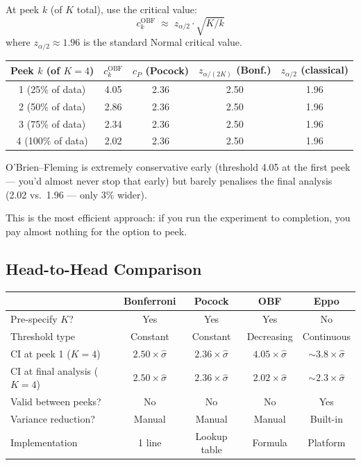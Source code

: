 \documentclass[12pt, a4paper]{article}
\begin{document}
At peek $k$ (of $K$ total), use the critical value:
\[
  c_k^{\text{OBF}} \;\approx\; z_{\alpha/2} \cdot \sqrt{K/k}
\]
where $z_{\alpha/2} \approx 1.96$ is the standard Normal critical value.

\begin{center}
\renewcommand{\arraystretch}{1.3}
\begin{tabular}{@{} c c c c c @{}}
\toprule
Peek $k$ (of $K{=}4$) & $c_k^{\text{OBF}}$ & $c_P$ (Pocock) &
  $z_{\alpha/(2K)}$ (Bonf.) & $z_{\alpha/2}$ (classical) \\
\midrule
1 (25\% of data) & 4.05 & 2.36 & 2.50 & 1.96 \\
2 (50\% of data) & 2.86 & 2.36 & 2.50 & 1.96 \\
3 (75\% of data) & 2.34 & 2.36 & 2.50 & 1.96 \\
4 (100\% of data) & 2.02 & 2.36 & 2.50 & 1.96 \\
\bottomrule
\end{tabular}
\end{center}

\begin{plainlanguage}
O'Brien--Fleming is extremely conservative early (threshold 4.05 at the
first peek --- you'd almost never stop that early) but barely penalises
the final analysis (2.02 vs.\ 1.96 --- only 3\% wider).

This is the most efficient approach: if you run the experiment to completion,
you pay almost nothing for the option to peek.
\end{plainlanguage}


\subsection{Head-to-Head Comparison}

\begin{center}
\renewcommand{\arraystretch}{1.3}
\begin{tabular}{@{} l c c c c @{}}
\toprule
& \textbf{Bonferroni} & \textbf{Pocock} & \textbf{OBF} & \textbf{Eppo} \\
\midrule
Pre-specify $K$?
  & Yes & Yes & Yes & No \\
Threshold type
  & Constant & Constant & Decreasing & Continuous \\
CI at peek 1 ($K{=}4$)
  & $2.50\times\hat{\sigma}$ & $2.36\times\hat{\sigma}$
  & $4.05\times\hat{\sigma}$ & $\sim\!3.8\times\hat{\sigma}$ \\
CI at final analysis ($K{=}4$)
  & $2.50\times\hat{\sigma}$ & $2.36\times\hat{\sigma}$
  & $2.02\times\hat{\sigma}$ & $\sim\!2.3\times\hat{\sigma}$ \\
Valid between peeks?
  & No & No & No & Yes \\
Variance reduction?
  & Manual & Manual & Manual & Built-in \\
Implementation
  & 1 line & Lookup table & Formula & Platform \\
\bottomrule
\end{tabular}
\end{center}
\end{document}
